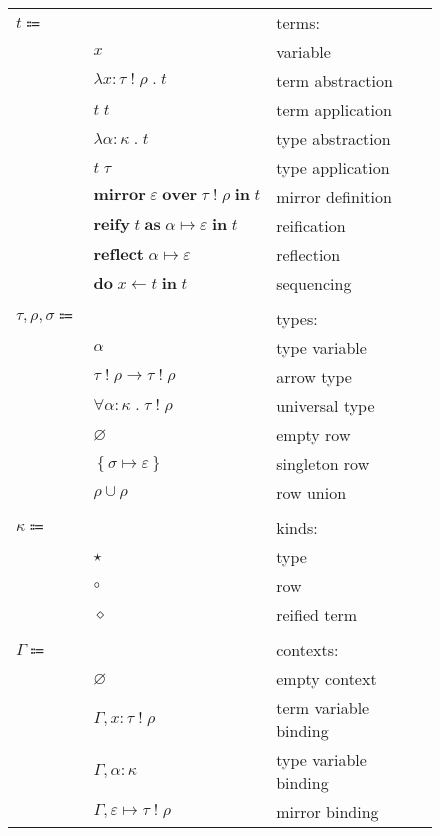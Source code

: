 \documentclass[12pt]{article}
\newcommand\kAnno[2]{#1 : #2}
\newcommand\tAnno[3]{#1 : \tEmbellished{#2}{#3}}
\newcommand\mVar{\varepsilon}
\newcommand\rToM[2]{#1 \mapsto #2}
\newcommand\term{t}
\newcommand\eVar{x}
\newcommand\eAbs[4]{\lambda \tAnno{#1}{#2}{#3} \; . \; #4}
\newcommand\eApp[2]{#1 \; #2}
\newcommand\eTAbs[3]{\lambda \kAnno{#1}{#2} \; . \; #3}
\newcommand\eTApp[2]{#1 \; #2}
\newcommand\eMirror[4]{\textbf{mirror} \; #1 \; \textbf{over} \; \tEmbellished{#2}{#3} \; \textbf{in} \; #4}
\newcommand\eReify[4]{\textbf{reify} \; #1 \; \textbf{as} \; \rToM{#2}{#3} \; \textbf{in} \; #4}
\newcommand\eReflect[2]{\textbf{reflect} \; \rToM{#1}{#2}}
\newcommand\eDo[3]{\textbf{do} \; #1 \leftarrow #2 \; \textbf{in} \; #3}
\newcommand\type{\tau}
\newcommand\tVar{\alpha}
\newcommand\tArrow[4]{\tEmbellished{#1}{#2} \rightarrow \tEmbellished{#3}{#4}}
\newcommand\tForAll[4]{\forall \kAnno{#1}{#2} \; . \; \tEmbellished{#3}{#4}}
\newcommand\row{\rho}
\newcommand\tEmbellished[2]{#1 \; ! \; #2}
\newcommand\tEmpty{\varnothing}
\newcommand\tSingleton[2]{\left\{ \rToM{#1}{#2} \right\}}
\newcommand\tUnion[2]{#1 \cup #2}
\newcommand\reification{\sigma}
\newcommand\kind{\kappa}
\newcommand\kType{\star}
\newcommand\kRow{\circ}
\newcommand\kReification{\diamond}
\newcommand\context{\Gamma}
\newcommand\cEmpty{\varnothing}
\newcommand\cEExtend[4]{#1, \tAnno{#2}{#3}{#4}}
\newcommand\cTExtend[3]{#1, \kAnno{#2}{#3}}
\newcommand\cMExtend[4]{#1, #2 \mapsto \tEmbellished{#3}{#4}}
\begin{document}
      \begin{figure}[H]
        \begin{mdframed}[backgroundcolor=none]
          \begin{center}
            \begin{tabular}{l l l}
              $\term \Coloneqq$ & & terms: \\
              & $\eVar$ & variable \\
              & $\eAbs{\eVar}{\type}{\row}{\term}$ & term abstraction \\
              & $\eApp{\term}{\term}$ & term application \\
              & $\eTAbs{\tVar}{\kind}{\term}$ & type abstraction \\
              & $\eTApp{\term}{\type}$ & type application \\
              & $\eMirror{\mVar}{\type}{\row}{\term}$ & mirror definition \\
              & $\eReify{\term}{\tVar}{\mVar}{\term}$ & reification \\
              & $\eReflect{\tVar}{\mVar}$ & reflection \\
              & $\eDo{\eVar}{\term}{\term}$ & sequencing \\
              \\
              $\type, \row, \reification \Coloneqq$ & & types: \\
              & $\tVar$ & type variable \\
              & $\tArrow{\type}{\row}{\type}{\row}$ & arrow type \\
              & $\tForAll{\tVar}{\kind}{\type}{\row}$ & universal type \\
              & $\tEmpty$ & empty row \\
              & $\tSingleton{\reification}{\mVar}$ & singleton row \\
              & $\tUnion{\row}{\row}$ & row union \\
              \\
              $\kind \Coloneqq$ & & kinds: \\
              & $\kType$ & type \\
              & $\kRow$ & row \\
              & $\kReification$ & reified term \\
              \\
              $\context \Coloneqq$ & & contexts: \\
              & $\cEmpty$ & empty context \\
              & $\cEExtend{\context}{\eVar}{\type}{\row}$ & term variable binding \\
              & $\cTExtend{\context}{\tVar}{\kind}$ & type variable binding \\
              & $\cMExtend{\context}{\mVar}{\type}{\row}$ & mirror binding \\
            \end{tabular}
          \end{center}


\end{mdframed}
\end{figure}
\end{document}
